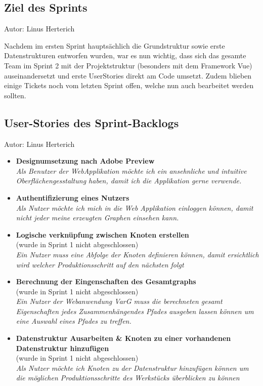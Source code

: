 
\subsection{Ziel des Sprints}
{\small Autor: Linus Herterich}

Nachdem im ersten Sprint hauptsächlich die Grundstruktur sowie erste Datenstrukturen entworfen wurden,
war es nun wichtig, dass sich das gesamte Team im Sprint 2 mit der Projektstruktur (besonders mit dem Framework Vue)
auseinandersetzt und erste UserStories direkt am Code umsetzt. Zudem blieben einige Tickets noch vom letzten Sprint offen,
welche nun auch bearbeitet werden sollten.

\subsection{User-Stories des Sprint-Backlogs}
{\small Autor: Linus Herterich}

\begin{itemize}
  \item \textbf{Designumsetzung nach Adobe Preview}
        \\\textit{
          Als Benutzer der WebApplikation möchte ich ein ansehnliche und intuitive
          Oberflächengesstaltung haben, damit ich die Applikation gerne verwende.}
  \item \textbf{Authentifizierung eines Nutzers}
        \\\textit{
          Als Nutzer möchte ich mich in die Web Applikation einloggen können,
          damit nicht jeder meine erzeugten Graphen einsehen kann.}
  \item \textbf{Logische verknüpfung zwischen Knoten erstellen}
        \\ (wurde in Sprint 1 nicht abgeschlossen)
        \\\textit{
          Ein Nutzer muss eine Abfolge der Knoten definieren können,
          damit ersichtlich wird welcher Produktionsschritt auf den nächsten folgt}
  \item \textbf{Berechnung der Eingenschaften des Gesamtgraphs}
        \\ (wurde in Sprint 1 nicht abgeschlossen)
        \\\textit{
          Ein Nutzer der Webanwendung VarG muss die berechneten gesamt Eigenschaften
          jedes Zusammenhängendes Pfades ausgeben lassen können um eine Auswahl
          eines Pfades zu treffen.}
  \item \textbf{Datenstruktur Ausarbeiten \& Knoten zu einer vorhandenen Datenstruktur hinzufügen}
        \\ (wurde in Sprint 1 nicht abgeschlossen)
        \\\textit{
          Als Nutzer möchte ich Knoten zu der Datenstruktur hinzufügen können
          um die möglichen Produktionsschritte des Werkstücks überblicken zu können}

\end{itemize}

